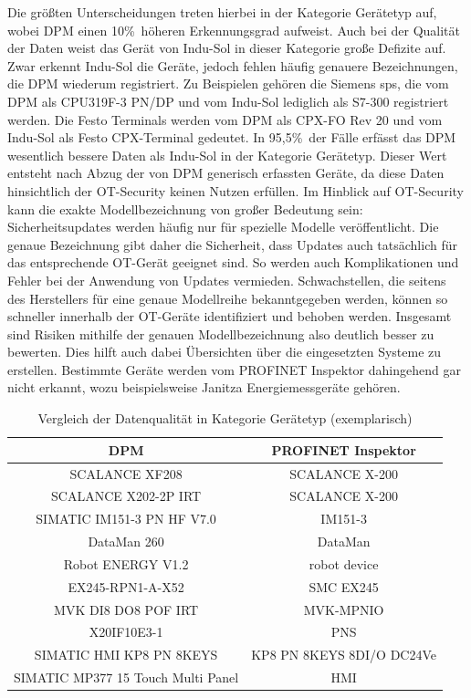 \noindent Die größten Unterscheidungen treten hierbei in der Kategorie Gerätetyp auf, wobei DPM einen 10\%\ höheren Erkennungsgrad aufweist. Auch bei der Qualität der Daten weist das Gerät von Indu-Sol in dieser Kategorie große Defizite auf. Zwar erkennt Indu-Sol die Geräte, jedoch fehlen häufig genauere Bezeichnungen, die DPM wiederum registriert. Zu Beispielen gehören die Siemens \ac{sps}, die vom DPM als CPU319F-3 PN/DP und vom Indu-Sol lediglich als S7-300 registriert werden. Die Festo Terminals werden vom DPM als CPX-FO Rev 20 und vom Indu-Sol als Festo CPX-Terminal gedeutet. In 95,5\%\ der Fälle erfässt das DPM wesentlich bessere Daten als Indu-Sol in der Kategorie Gerätetyp. Dieser Wert entsteht nach Abzug der von DPM generisch erfassten Geräte, da diese Daten hinsichtlich der OT-Security keinen Nutzen erfüllen. Im Hinblick auf OT-Security kann die exakte Modellbezeichnung von großer Bedeutung sein: Sicherheitsupdates werden häufig nur für spezielle Modelle veröffentlicht. Die genaue Bezeichnung gibt daher die Sicherheit, dass Updates auch tatsächlich für das entsprechende OT-Gerät geeignet sind. So werden auch Komplikationen und Fehler bei der Anwendung von Updates vermieden. Schwachstellen, die seitens des Herstellers für eine genaue Modellreihe bekanntgegeben werden, können so schneller innerhalb der OT-Geräte identifiziert und behoben werden. Insgesamt sind Risiken mithilfe der genauen Modellbezeichnung also deutlich besser zu bewerten. Dies hilft auch dabei Übersichten über die eingesetzten Systeme zu erstellen. Bestimmte Geräte werden vom PROFINET Inspektor dahingehend gar nicht erkannt, wozu beispielsweise Janitza Energiemessgeräte gehören. 
\bigskip

\begin{table}[h]
\centering
\caption{Vergleich der Datenqualität in Kategorie Gerätetyp (exemplarisch)}
\begin{tabular}{|c|c|}
\hline
\textbf{DPM} & \textbf{PROFINET Inspektor} \\
\hline
SCALANCE XF208 & SCALANCE X-200 \\
\hline
SCALANCE X202-2P IRT & SCALANCE X-200 \\
\hline
SIMATIC IM151-3 PN HF V7.0 & IM151-3\\
\hline
DataMan 260 & DataMan \\
\hline
Robot ENERGY V1.2 & robot device \\
\hline
EX245-RPN1-A-X52 &SMC EX245 \\
\hline
MVK DI8 DO8 POF IRT & MVK-MPNIO \\
\hline
X20IF10E3-1 & PNS \\
\hline
SIMATIC HMI KP8 PN 8KEYS  & KP8 PN 8KEYS 8DI/O DC24Ve \\
\hline
SIMATIC MP377 15 Touch Multi Panel & HMI \\
\hline
\end{tabular}
\label{tab:beispiel}
\end{table}

